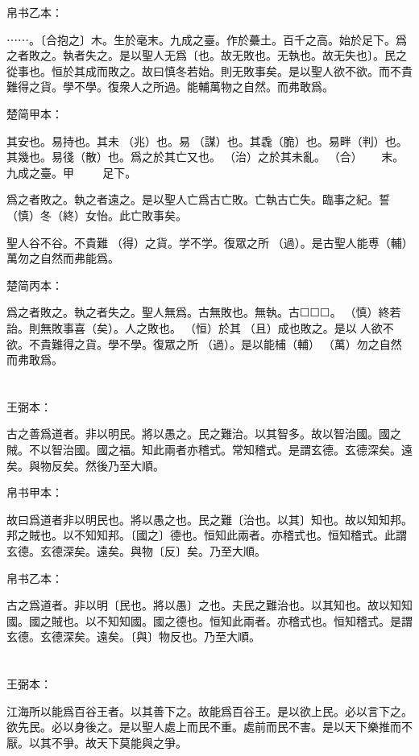 \documentclass[a5paper]{ctexbook}
\begin{document}
    帛书乙本：

    ⋯⋯。〔合抱之〕木。生於毫末。九成之臺。作於虆土。百千之高。始於足下。爲之者敗之。執者失之。是以聖人无爲〔也。故无敗也。无執也。故无失也〕。民之從事也。恒於其成而敗之。故曰慎冬若始。則无敗事矣。是以聖人欲不欲。而不貴難得之貨。學不學。復衆人之所過。能輔萬物之自然。而弗敢爲。

    楚简甲本：

    其安也。易持也。其未󶵆（兆）也。易𢘃（謀）也。其毳（脆）也。易畔（判）也。其幾也。易㣤（散）也。爲之於其亡又也。𥿆（治）之於其未亂。𣌭（合）☐☐☐☐☐☐末。九成之臺。甲☐☐☐☐☐☐☐☐☐足下。

    爲之者敗之。執之者遠之。是以聖人亡爲古亡敗。亡執古亡失。臨事之紀。誓（慎）冬（終）女怡。此亡敗事矣。

    聖人谷不谷。不貴難󶴫（得）之貨。学不学。復眾之所󶴬（過）。是古聖人能尃（輔）萬勿之自然而弗能爲。

    楚简丙本：

    爲之者敗之。執之者失之。聖人無爲。古無敗也。無執。古☐☐☐。󶴤（慎）終若詒。則無敗事喜（矣）。人之敗也。𠄨（恒）於其𠭯（且）成也敗之。是以☐人欲不欲。不貴難得之貨。學不學。復眾之所󶴭（過）。是以能㭪（輔）󼧕（萬）勿之自然而弗敢爲。

    \chapter{}
    王弼本：

    古之善爲道者。非以明民。將以愚之。民之難治。以其智多。故以智治國。國之賊。不以智治國。國之福。知此兩者亦稽式。常知稽式。是謂玄德。玄德深矣。遠矣。與物反矣。然後乃至大順。

    
    帛书甲本：

    故曰爲道者非以明民也。將以愚之也。民之難〔治也。以其〕知也。故以知知邦。邦之賊也。以不知知邦。〔國之〕德也。恒知此兩者。亦稽式也。恒知稽式。此謂玄德。玄德深矣。遠矣。與物〔反〕矣。乃至大順。

    帛书乙本：

    古之爲道者。非以明〔民也。將以愚〕之也。夫民之難治也。以其知也。故以知知國。國之賊也。以不知知國。國之德也。恒知此兩者。亦稽式也。恒知稽式。是謂玄德。玄德深矣。遠矣。〔與〕物反也。乃至大順。

    \chapter{}
    王弼本：

    江海所以能爲百谷王者。以其善下之。故能爲百谷王。是以欲上民。必以言下之。欲先民。必以身後之。是以聖人處上而民不重。處前而民不害。是以天下樂推而不厭。以其不爭。故天下莫能與之爭。
\end{document}
